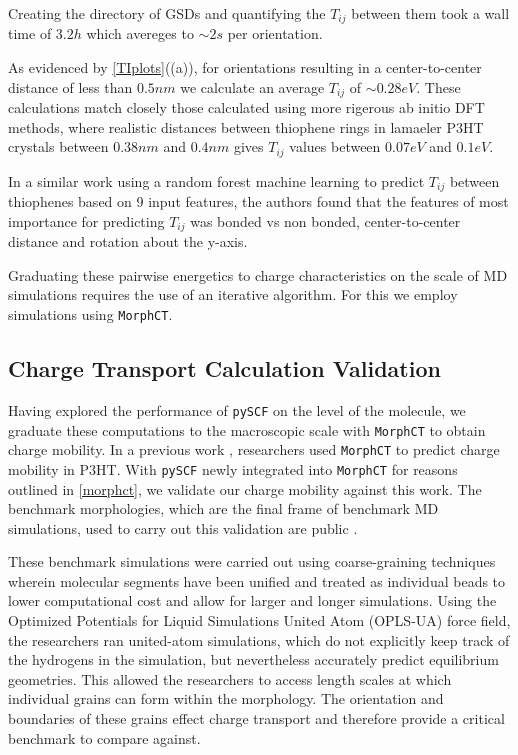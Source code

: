 Creating the directory of GSDs and quantifying the $T_{ij}$ between them took a wall time of $3.2h$ which
avereges to ${\sim}2s$ per orientation. 

As evidenced by \autoref{TIplots}((a)), for orientations resulting in a center-to-center distance of less than
$0.5nm$ we calculate an average $T_{ij}$ of ${\sim} 0.28eV$.  
These calculations match closely those
calculated using more rigerous ab initio DFT methods\cite{Lan2008},
where realistic distances between thiophene rings in lamaeler P3HT crystals 
between $0.38nm$ and $0.4 nm$ gives $T_{ij}$ values between $0.07eV$ and $0.1eV$. 

In a similar work using a random forest machine learning to predict $T_{ij}$
between thiophenes based on 9 input features, the authors found that the
features of most importance for predicting $T_{ij}$ was bonded vs non bonded,
center-to-center distance and rotation about the y-axis. \cite{Jankowski2019c}

Graduating these pairwise energetics to charge characteristics on the scale of MD simulations
requires the use of an iterative algorithm. For this we employ  simulations using \texttt{MorphCT}.

\subsection{Charge Transport Calculation Validation}

Having explored the performance of \texttt{pySCF} on the level of the molecule, we graduate these computations to the
macroscopic scale with \texttt{MorphCT} to obtain charge mobility.
In a previous work \cite{Miller2018}, researchers used \texttt{MorphCT} to predict charge mobility in P3HT. 
With \texttt{pySCF} newly integrated into \texttt{MorphCT} for reasons outlined in \autoref{morphct},
we validate our charge mobility against this work.
The benchmark morphologies, which are the final frame of benchmark MD simulations,
used to carry out this validation are public \cite{P3HTData}. 

These benchmark simulations were carried out using coarse-graining techniques
wherein molecular segments have been unified and treated as individual beads to lower
computational cost and allow for larger and longer simulations. 
Using the Optimized Potentials for Liquid Simulations United Atom (OPLS-UA) force field,
the researchers ran united-atom simulations, which do
not explicitly keep track of the hydrogens in the simulation, 
but nevertheless accurately predict equilibrium geometries. This allowed the researchers to access length scales
at which individual grains can form within the morphology. The orientation and boundaries of these grains effect
charge transport and therefore provide a critical benchmark to compare against. 

